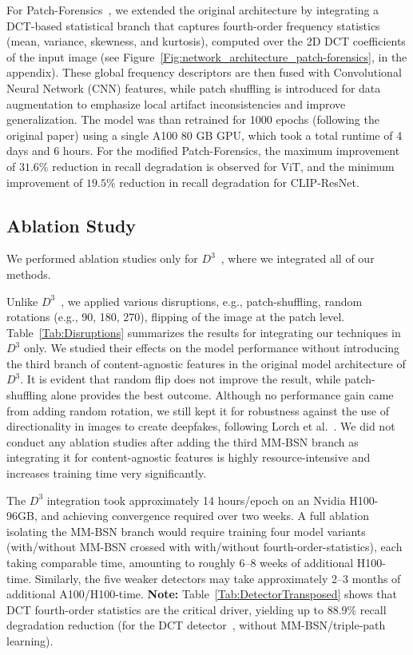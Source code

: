 \documentclass[letterpaper,twocolumn,10pt]{article}
\newcommand{\subhead}[1]{\vspace{1pt}\noindent{\textbf{#1.}}}
\begin{document}
For Patch-Forensics~\cite{chai2020makesfakeimagesdetectable}, we extended the original architecture by integrating a DCT-based statistical branch that captures fourth-order frequency statistics (mean, variance, skewness, and kurtosis), computed over the 2D DCT coefficients of the input image (see Figure~\ref{Fig:network_architecture_patch-forensics}, in the appendix).
These global frequency descriptors are then fused with Convolutional Neural Network (CNN) features, while patch shuffling is introduced for data augmentation to emphasize local artifact inconsistencies and improve generalization.  The model was than retrained for 1000 epochs (following the original paper) using a single A100 80 GB GPU, which took a total runtime of 4 days and 6 hours.
For the modified Patch-Forensics, the maximum improvement of $31.6\%$ reduction in recall degradation is observed for ViT, and the minimum improvement of $19.5\%$ reduction in recall degradation for CLIP-ResNet.


\subsection{Ablation Study}
We performed ablation studies only for $D^3$~\cite{yang2025d3}, where we integrated all of our methods.

\subhead{Effects of different disruptions} Unlike $D^3$~\cite{yang2025d3}, we applied various disruptions, e.g., patch-shuffling, random rotations (e.g., 90, 180, 270), flipping of the image at the patch level. 
%
Table~\ref{Tab:Disruptions} summarizes the results for integrating our techniques in $D^3$ only. We studied their effects on the model performance without introducing the third branch of content-agnostic features in the original model architecture of $D^3$. It is evident that random flip does not improve the result, while patch-shuffling alone provides the best outcome. Although no performance gain came from adding random rotation, we still kept it for robustness against the use of directionality in images to create deepfakes, following Lorch et al.~\cite{Lorch2024landscape}. We did not conduct any ablation studies after adding the third MM-BSN branch as integrating it for content-agnostic features is highly resource-intensive and increases training time very significantly.  


The $D^3$ integration took approximately 14 hours/epoch on an Nvidia H100-96GB, and achieving convergence required over two weeks. A full ablation isolating the MM-BSN branch would require training four model variants (with/without MM-BSN crossed with with/without fourth-order-statistics), each taking comparable time, amounting to roughly 6–8 weeks of additional H100-time. Similarly, the five weaker detectors may take approximately 2–3 months of additional A100/H100-time. \textbf{Note:} Table~\ref{Tab:DetectorTransposed}  shows that DCT fourth-order statistics are the critical driver, yielding up to 88.9\%  recall degradation reduction (for the DCT detector~\cite{Ricker2024detection}, without MM-BSN/triple-path learning). 
\end{document}
